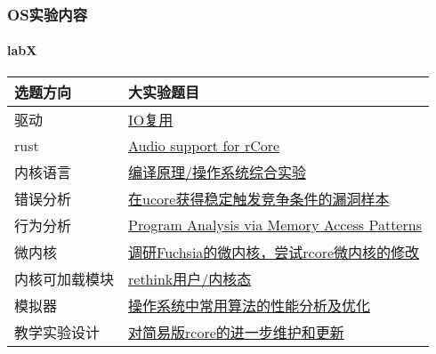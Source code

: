 \begin{frame}
	\frametitle{OS实验内容}
	\framesubtitle{labX}
	
	\begin{longtable}[]{@{}|l|l|@{}}
		\toprule
		选题方向 & 大实验题目\tabularnewline
		\midrule
		\endhead
		驱动 &
		\href{http://os.cs.tsinghua.edu.cn/oscourse/OsTrain2019/g4}{IO复用}\tabularnewline \hline
		rust &
		\href{http://os.cs.tsinghua.edu.cn/oscourse/OS2019spring/projects/g08}{Audio
			support for rCore}\tabularnewline \hline
		内核语言 &
		\href{http://os.cs.tsinghua.edu.cn/oscourse/OsTrain2019/g6}{编译原理/操作系统综合实验}\tabularnewline \hline
		错误分析 &
		\href{http://os.cs.tsinghua.edu.cn/oscourse/OS2019spring/projects/g07}{在ucore获得稳定触发竞争条件的漏洞样本}\tabularnewline \hline
		行为分析 &
		\href{http://os.cs.tsinghua.edu.cn/oscourse/OS2019spring/projects/g09}{Program
			Analysis via Memory Access Patterns}\tabularnewline \hline
		微内核 &
		\href{http://os.cs.tsinghua.edu.cn/oscourse/OsTrain2019/g1}{调研Fuchsia的微内核，尝试rcore微内核的修改}\tabularnewline \hline
		内核可加载模块 &
		\href{http://os.cs.tsinghua.edu.cn/oscourse/OsTrain2019/g5}{rethink用户/内核态}\tabularnewline \hline
		模拟器 &
		\href{http://os.cs.tsinghua.edu.cn/oscourse/OS2019spring/projects/g10}{操作系统中常用算法的性能分析及优化}\tabularnewline \hline
		教学实验设计 &
		\href{http://os.cs.tsinghua.edu.cn/oscourse/OsTrain2019/g7}{对简易版rcore的进一步维护和更新}\tabularnewline \hline
		\bottomrule
	\end{longtable}
	

\end{frame}


